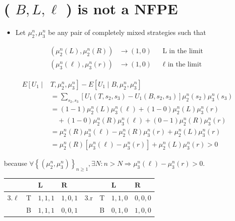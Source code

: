 \documentclass[10pt]{article}
\begin{document}
\section*{( $B, L, \ell$ ) is not a NFPE}
\begin{itemize}
  \item Let $\mu_{2}^{n}, \mu_{3}^{n}$ be any pair of completely mixed strategies such that
\end{itemize}

$$
\begin{aligned}
\left(\mu_{2}^{n}(L), \mu_{2}^{n}(R)\right) & \rightarrow(1,0) & & \mathrm{L} \text { in the limit } \\
\left(\mu_{3}^{n}(\ell), \mu_{3}^{n}(r)\right) & \rightarrow(1,0) & & \ell \text { in the limit }
\end{aligned}
$$

$$
\begin{aligned}
E\left[U_{1} \mid\right. & \left.T, \mu_{2}^{n}, \mu_{3}^{n}\right]-E\left[U_{1} \mid B, \mu_{2}^{n}, \mu_{3}^{n}\right] \\
& =\sum_{s_{2}, s_{3}}\left[U_{1}\left(T, s_{2}, s_{3}\right)-U_{1}\left(B, s_{2}, s_{3}\right)\right] \mu_{2}^{n}\left(s_{2}\right) \mu_{3}^{n}\left(s_{3}\right) \\
& =(1-1) \mu_{2}^{n}(L) \mu_{3}^{n}(\ell)+(1-0) \mu_{2}^{n}(L) \mu_{3}^{n}(r) \\
& \quad+(1-0) \mu_{2}^{n}(R) \mu_{3}^{n}(\ell)+(0-1) \mu_{2}^{n}(R) \mu_{3}^{n}(r) \\
& =\mu_{2}^{n}(R) \mu_{3}^{n}(\ell)-\mu_{2}^{n}(R) \mu_{3}^{n}(r)+\mu_{2}^{n}(L) \mu_{3}^{n}(r) \\
& =\mu_{2}^{n}(R)\left[\mu_{3}^{n}(\ell)-\mu_{3}^{n}(r)\right]+\mu_{2}^{n}(L) \mu_{3}^{n}(r)>0
\end{aligned}
$$

because $\forall\left\{\left(\mu_{2}^{n}, \mu_{3}^{n}\right)\right\}_{n \geq 1}, \exists N: n>N \Longrightarrow \mu_{3}^{n}(\ell)-\mu_{3}^{n}(r)>0$.

\begin{center}
\begin{tabular}{llllllll}
 &  & $\mathbf{L}$ & $\mathbf{R}$ &  &  & $\mathbf{L}$ & $\mathbf{R}$ \\
\hline
$3 . \ell$ & T & $1,1,1$ & $1,0,1$ & $3 . \mathrm{r}$ & T & $1,1,0$ & $0,0,0$ \\
\hline
 & B & $1,1,1$ & $0,0,1$ &  & B & $0,1,0$ & $1,0,0$ \\
\hline
\end{tabular}
\end{center}
\end{document}
